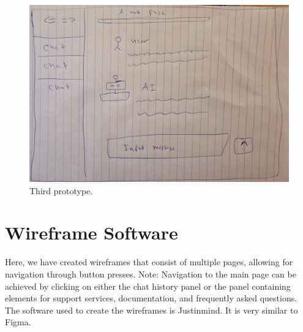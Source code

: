 \documentclass{l4proj}
\begin{document}
\begin{appendices}
\begin{figure}[h!]
  \centering
  \begin{adjustbox}{center,max height=0.35\textheight, max width=\linewidth}
    \includegraphics{images/initial3.jpeg}
  \end{adjustbox}
  \caption{Third prototype.}
\end{figure}

\chapter{Wireframe Software}
\label{Wireframe Software}

Here, we have created wireframes that consist of multiple pages, allowing for navigation through button presses. Note: Navigation to the main page can be achieved by clicking on either the chat history panel or the panel containing elements for support services, documentation, and frequently asked questions. The software used to create the wireframes is Justinmind. It is very similar to Figma.


\end{appendices}
\end{document}
